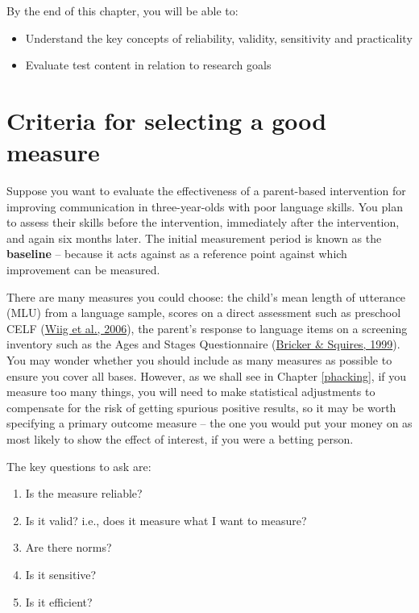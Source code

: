 \documentclass{krantz}
\providecommand{\tightlist}{%
\setlength{\itemsep}{0pt}\setlength{\parskip}{0pt}}
\begin{document}
By the end of this chapter, you will be able to:

\begin{itemize}
\item
  Understand the key concepts of reliability, validity, sensitivity and practicality
\item
  Evaluate test content in relation to research goals
\end{itemize}

\hypertarget{criteria-for-selecting-a-good-measure}{%
\section{Criteria for selecting a good measure}\label{criteria-for-selecting-a-good-measure}}

Suppose you want to evaluate the effectiveness of a parent-based intervention for improving communication in three-year-olds with poor language skills. You plan to assess their skills before the intervention, immediately after the intervention, and again six months later. The initial measurement period is known as the \textbf{baseline} --  because it acts against as a reference point against which improvement can be measured.

There are many measures you could choose: the child's mean length of utterance (MLU) from a language sample, scores on a direct assessment such as preschool CELF (\protect\hyperlink{ref-wiig2006}{Wiig et al., 2006}), the parent's response to language items on a screening inventory such as the Ages and Stages Questionnaire (\protect\hyperlink{ref-bricker1999}{Bricker \& Squires, 1999}). You may wonder whether you should include as many measures as possible to ensure you cover all bases. However, as we shall see in Chapter \ref{phacking}, if you measure too many things, you will need to make statistical adjustments to compensate for the risk of getting spurious positive results, so it may be worth specifying a primary outcome measure -- the one you would put your money on as most likely to show the effect of interest, if you were a betting person.

The key questions to ask are:

\begin{enumerate}
\def\labelenumi{\arabic{enumi}.}
\tightlist
\item
  Is the measure reliable?
\item
  Is it valid? i.e., does it measure what I want to measure?
\item
  Are there norms?
\item
  Is it sensitive?
\item
  Is it efficient?
\end{enumerate}
\end{document}
